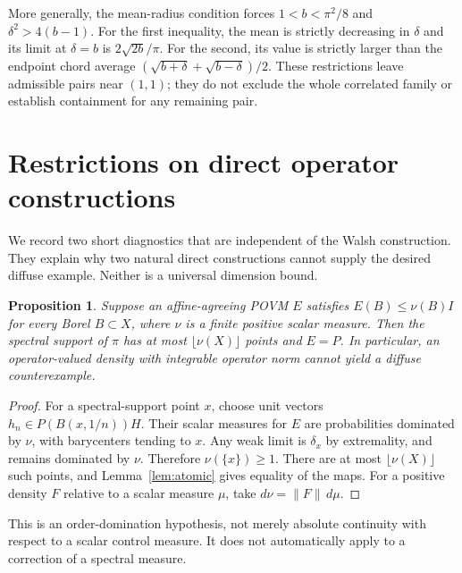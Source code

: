 \documentclass[11pt,letterpaper]{amsart}
\newtheorem{proposition}[theorem]{Proposition}
\theoremstyle{definition}
\theoremstyle{remark}
\numberwithin{equation}{section}
\begin{document}
More generally, the mean-radius condition forces
$1<b<\pi^2/8$ and $\delta^2>4(b-1)$. For the first inequality,
the mean is strictly decreasing in $\delta$ and its limit at
$\delta=b$ is $2\sqrt{2b}/\pi$. For the second, its value is strictly
larger than the endpoint chord average
$(\sqrt{b+\delta}+\sqrt{b-\delta})/2$.
These restrictions leave admissible pairs near $(1,1)$; they do not
exclude the whole correlated family or establish containment for any
remaining pair.

\section{Restrictions on direct operator constructions}
\label{app:direct}

We record two short diagnostics that are independent of the Walsh
construction. They explain why two natural direct constructions cannot
supply the desired diffuse example. Neither is a universal dimension
bound.

\begin{proposition}\label{pert:prop:density}
Suppose an affine-agreeing POVM $E$ satisfies $E(B)\le\nu(B)I$ for
every Borel $B\subset X$, where $\nu$ is a finite positive scalar measure.
Then the spectral support of $\pi$ has at most $\lfloor\nu(X)\rfloor$
points and $E=P$. In particular, an operator-valued density with
integrable operator norm cannot yield a diffuse counterexample.
\end{proposition}
\begin{proof}
For a spectral-support point $x$, choose unit vectors
$h_n\in P(B(x,1/n))H$. Their scalar measures for $E$ are probabilities
dominated by $\nu$, with barycenters tending to $x$. Any weak limit is
$\delta_x$ by extremality, and remains dominated by $\nu$. Therefore
$\nu(\{x\})\ge1$. There are at most $\lfloor\nu(X)\rfloor$ such points,
and Lemma~\ref{lem:atomic} gives equality of the maps.
For a positive density $F$ relative to a scalar measure $\mu$, take
$d\nu=\|F\|\,d\mu$.
\end{proof}

This is an order-domination hypothesis, not merely absolute continuity
with respect to a scalar control measure. It does not automatically
apply to a correction of a spectral measure.
\end{document}
